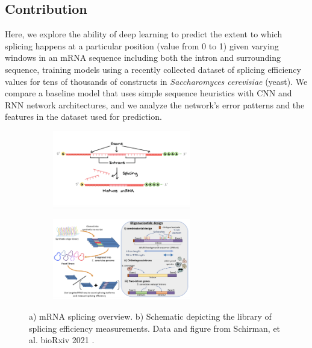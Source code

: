 \documentclass{article}
\begin{document}
\subsection{Contribution}
Here, we explore the ability of deep learning to predict the extent to which splicing happens at a particular position (value from 0 to 1) given varying windows in an mRNA sequence including both the intron and surrounding sequence, training models using a recently collected dataset of splicing efficiency values for tens of thousands of constructs in {\it Saccharomyces cerevisiae} (yeast). We compare a baseline model that uses simple sequence heuristics with CNN and RNN network architectures, and we analyze the network's error patterns and the features in the dataset used for prediction.
\begin{figure}[H]
\centering
\begin{subfigure}{.4 \textwidth}
\centering
\includegraphics[width=6cm]{../figures/splicing_graphic.png} \caption{} 
\label{fig:splicing}
\end{subfigure}
\begin{subfigure}{.5 \textwidth}
\centering
\includegraphics[width=6cm]{../figures/dataset_overview_pilpel.png} \caption{}  
\label{fig:dataset}
\end{subfigure}
\caption{a) mRNA splicing overview. b) Schematic depicting the library of splicing efficiency measurements. Data and figure from Schirman, et al. bioRxiv 2021 \cite{pilpel}.}
\end{figure}
\end{document}

